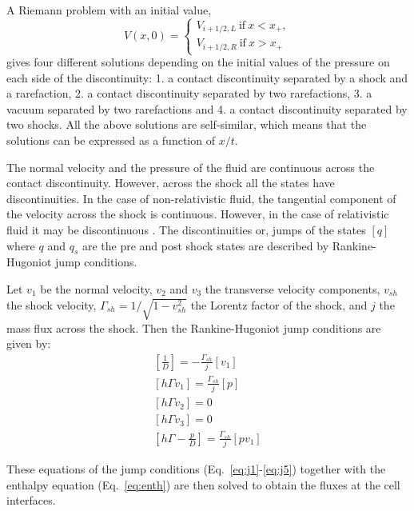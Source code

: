 A Riemann problem with an initial value,
\begin{equation}
V(x, 0) = \begin{cases}
V_{i+1/2, L} \ \textrm{if} \  x < x_+,  \\
V_{i+1/2, R} \ \textrm{if} \  x > x_+
\end{cases}
\label{eq:Rp}
\end{equation}
gives four different solutions depending on the initial values of the pressure on each side of the discontinuity: 1. a contact discontinuity separated by a shock and a rarefaction, 2. a contact discontinuity separated by two rarefactions, 3. a vacuum separated by two rarefactions and 4. a contact discontinuity separated by two shocks. All the above solutions are self-similar, which means  that the solutions can be expressed as a function of $x/t$. 

The normal velocity and the pressure of the fluid are continuous across the contact discontinuity. However, across the shock  all the states have discontinuities. In the case of non-relativistic fluid, the tangential component of the velocity across the shock is continuous. However, in the case of relativistic fluid it may be discontinuous \citep{mignone07}. The discontinuities or, jumps of the states $[q]$ where  $q$ and $q_s$ are the pre and post shock states are described by Rankine-Hugoniot jump conditions.

Let $v_1$ be the normal velocity, $v_2$ and $v_3$ the transverse velocity components, $v_{sh}$ the shock velocity, $\Gamma_{sh} = 1/\sqrt{1-v_{sh}^2}$ the Lorentz factor of the shock, and $j$ the mass flux across the shock.  Then the Rankine-Hugoniot jump conditions are given by:
\begin{eqnarray}
\left[\frac{1}{D}\right] = - \frac{\Gamma_{sh}}{j} [v_1] \label{eq:j1}\\
\left[ h \Gamma v_1 \right ] = \frac{\Gamma_{sh}}{j}[p] \label{eq:j2}\\
\left[ h \Gamma v_2 \right ] = 0 \label{eq:j3}\\
\left[ h \Gamma v_3 \right ] = 0 \label{eq:j4}\\
\left[ h \Gamma -\frac{p}{D} \right ]=  \frac{\Gamma_{sh}}{j} [pv_1] \label{eq:j5}
\end{eqnarray}

These equations of the jump conditions (Eq.~\ref{eq:j1}-\ref{eq:j5}) together with the enthalpy equation (Eq.~\ref{eq:enth}) are then solved to obtain the fluxes at the cell interfaces.
 
